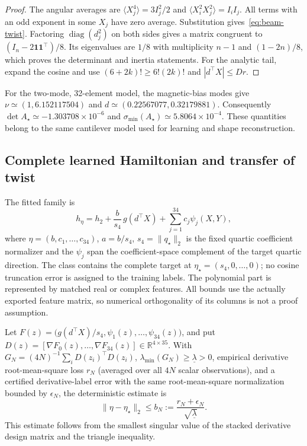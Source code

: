 \begin{proof}
The angular averages are $\langle X_j^4\rangle=3I_j^2/2$ and
$\langle X_i^2X_j^2\rangle=I_iI_j$. All terms with an odd exponent in
some $X_j$ have zero average. Substitution gives~\eqref{eq:beam-twist}.
Factoring $\operatorname{diag}(d_j^2)$ on both sides gives a matrix
congruent to $(I_n-2\mathbf1\mathbf1^\top)/8$.
Its eigenvalues are $1/8$ with multiplicity $n-1$ and $(1-2n)/8$,
which proves the determinant and inertia statements.
For the analytic tail, expand the cosine and use
$(6+2k)!\geq6!(2k)!$ and $|d^\top X|\leq Dr$.
\end{proof}

For the two-mode, 32-element model, the magnetic-bias modes give
$\nu\simeq(1,6.152117504)$ and
$d\simeq(0.22567077,0.32179881)$.
Consequently $\det A_\star\simeq-1.303708\times10^{-6}$ and
$\sigma_{\min}(A_\star)\simeq5.8064\times10^{-4}$.
These quantities belong to the same cantilever model used for learning
and shape reconstruction.

\subsection{Complete learned Hamiltonian and transfer of twist}
\label{sec:unified-learning-twist}
The fitted family is
\begin{equation}
 h_\eta=h_2+\frac{b}{s_4}\,g(d^\top X)+\sum_{j=1}^{34}c_j\psi_j(X,Y),
 \label{eq:beam-learned-h}
\end{equation}
where $\eta=(b,c_1,\ldots,c_{34})$, $a=b/s_4$,
$s_4=\|q_\star\|_2$ is the fixed quartic coefficient normalizer and
the $\psi_j$ span the coefficient-space complement of the target
quartic direction. The class contains the complete target at
$\eta_\star=(s_4,0,\ldots,0)$; no cosine truncation error is assigned to the
training labels. The polynomial part is represented by matched real or
complex features. All bounds use the actually exported feature matrix,
so numerical orthogonality of its columns is not a proof assumption.

Let $F(z)=\bigl(g(d^\top X)/s_4,\psi_1(z),\ldots,\psi_{34}(z)\bigr)$,
and put $D(z)=[\nabla F_0(z),\ldots,\nabla F_{34}(z)]\in\mathbb R^{4\times35}$.
With $G_N=(4N)^{-1}\sum_i D(z_i)^\top D(z_i)$,
$\lambda_{\min}(G_N)\geq\underline\lambda>0$, empirical derivative
root-mean-square loss $r_N$ (averaged over all $4N$ scalar observations),
and a certified derivative-label error with the same root-mean-square
normalization bounded by $\epsilon_N$, the deterministic estimate is
\begin{equation}
 \|\eta-\eta_\star\|_2\leq
 b_N:=\frac{r_N+\epsilon_N}{\sqrt{\underline\lambda}}.
 \label{eq:beam-feature-bound}
\end{equation}
This estimate follows from the smallest singular value of the stacked
derivative design matrix and the triangle inequality.

